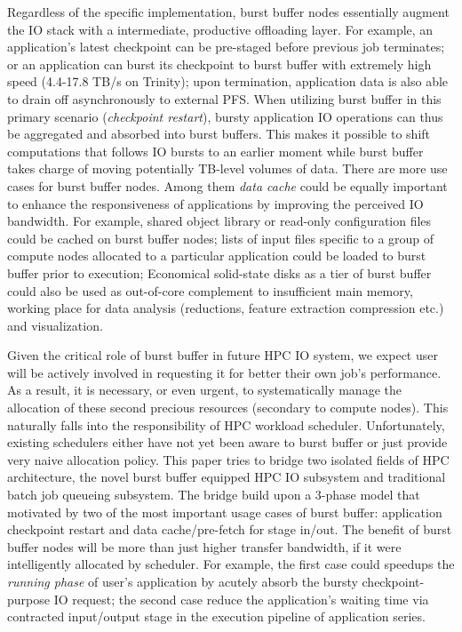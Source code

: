 Regardless of the specific implementation, burst buffer nodes essentially augment
the IO stack with a intermediate, productive offloading layer.
For example, an application's latest checkpoint can be pre-staged
before previous job terminates;
or an application can burst its checkpoint to burst buffer
with extremely high speed (4.4-17.8 TB/s on Trinity);
upon termination, application data is also able to drain off
asynchronously to external PFS.
When utilizing burst buffer in this primary scenario (\textit{checkpoint restart}),
bursty application IO operations can thus be aggregated and absorbed into burst buffers.
This makes it possible to shift computations that follows IO bursts to an earlier moment
while burst buffer takes charge of moving potentially TB-level volumes of data.
There are more use cases for burst buffer nodes.
Among them \textit{data cache} could be equally important to enhance the responsiveness
of applications by improving the perceived IO bandwidth\cite{BBUseCase}.
For example, shared object library or read-only configuration files could be
cached on burst buffer nodes;
lists of input files specific to a group of compute nodes allocated to
a particular application could be loaded to burst buffer prior to execution;
Economical solid-state disks as a tier of burst buffer could also be used as
out-of-core complement to insufficient main memory\cite{Romanus:CORR:15},
working place for data analysis (reductions, feature extraction compression etc.)
and visualization\cite{BBUseCase}.

Given the critical role of burst buffer in future HPC IO system,
we expect user will be actively involved in requesting it for
better their own job's performance.
As a result, it is necessary, or even urgent, to systematically manage
the allocation of these second precious resources (secondary to compute nodes).
This naturally falls into the responsibility of HPC workload scheduler.
Unfortunately, existing schedulers
either have not yet been aware to burst buffer\cite{Moab} %
or just provide very naive allocation policy\cite{SlurmBBGuide}.
This paper tries to bridge two isolated fields of HPC architecture,
the novel burst buffer equipped HPC IO subsystem and
traditional batch job queueing subsystem.
The bridge build upon a 3-phase model that motivated by two of the most
important usage cases of burst buffer:
application checkpoint restart and data cache/pre-fetch for stage in/out.
The benefit of burst buffer nodes will be more than just higher transfer
bandwidth, if it were intelligently allocated by scheduler.
For example, the first case could speedups the \textit{running phase} of
user's application by acutely absorb the bursty checkpoint-purpose IO request;
the second case reduce the application's waiting time via
contracted input/output stage in the execution pipeline of application series.

